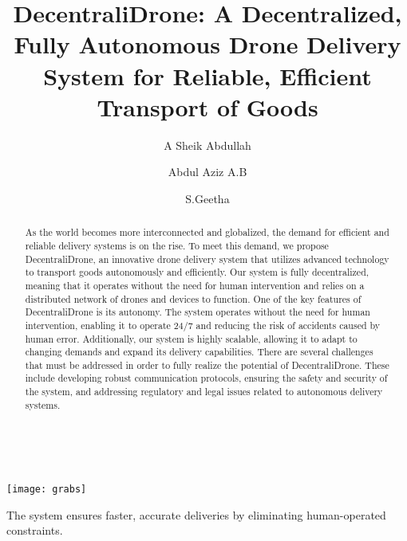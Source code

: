\documentclass[preprint,12pt]{elsarticle}
\begin{document}
\begin{frontmatter}

\title{DecentraliDrone: A Decentralized, Fully Autonomous Drone Delivery System for Reliable, Efficient Transport of Goods}

\author[a]{A Sheik Abdullah}

\author[a]{Abdul Aziz A.B}

\author[a]{S.Geetha}


\address[a]{School of Computer Science and Engineering, Vellore Institute of Technology - Chennai Campus, Chennai 600127, Tamil Nadu, India}


\begin{abstract}
As the world becomes more interconnected and globalized, the demand for efficient and reliable delivery systems is on the rise. To meet this demand, we propose DecentraliDrone, an innovative drone delivery system that utilizes advanced technology to transport goods autonomously and efficiently. Our system is fully decentralized, meaning that it operates without the need for human intervention and relies on a distributed network of drones and devices to function. One of the key features of DecentraliDrone is its autonomy. The system operates without the need for human intervention, enabling it to operate 24/7 and reducing the risk of accidents caused by human error. Additionally, our system is highly scalable, allowing it to adapt to changing demands and expand its delivery capabilities.
There are several challenges that must be addressed in order to fully realize the potential of DecentraliDrone. These include developing robust communication protocols, ensuring the safety and security of the system, and addressing regulatory and legal issues related to autonomous delivery systems.

\end{abstract}\\

\begin{graphicalabstract}
\texttt{[image: grabs]}
\end{graphicalabstract}
\begin{highlights}
\item The system ensures faster, accurate deliveries by eliminating human-operated constraints.


\end{highlights}
\end{frontmatter}
\end{document}
